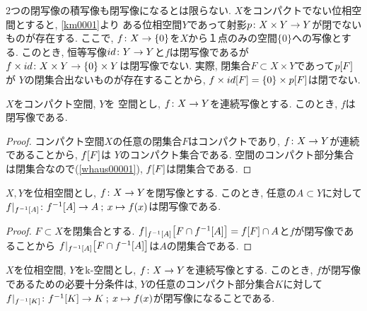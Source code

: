 \documentclass[uplatex, dvipdfmx, a4paper, 12pt, class=jsbook, crop=false]{standalone}
\begin{document}
\begin{example}
	2つの閉写像の積写像も閉写像になるとは限らない.
	$ X $をコンパクトでない位相空間とすると, \cref{km0001}より
	ある位相空間$ Y $であって射影$ p\colon X \times Y\to Y $が閉でないものが存在する.
	ここで, $ f\colon X\to\{0\} $を$ X $から１点のみの空間$ \{0\} $への写像とする.
	このとき, 恒等写像$ id\colon Y\to Y $と$ f $は閉写像であるが
	$ f \times id\colon X \times Y\to\{0\} \times Y $は閉写像でない.
	実際, 閉集合$ F \subset X \times Y $であって$ \mapset{p}{F} $が
	$ Y $の閉集合出ないものが存在することから,
	$ \mapset{f \times id}{F} = \{0\} \times \mapset{p}{F} $は閉でない.
\end{example}

\begin{proposition}
	$ X $をコンパクト空間, $ Y $を \Hausdorff 空間とし, $ f\colon X\to Y $を連続写像とする.
	このとき, $ f $は閉写像である.
\end{proposition}

\begin{proof}
	コンパクト空間$ X $の任意の閉集合$ F $はコンパクトであり,
	$ f\colon X\to Y $が連続であることから, $ \mapset{f}{F} $は
	$ Y $のコンパクト集合である.
	\Hausdorff 空間のコンパクト部分集合は閉集合なので(\cref{whaus00001}),
	$ \mapset{f}{F} $は閉集合である.
\end{proof}

\begin{proposition}
	\label{c00002}
	$ X, Y $を位相空間とし, $ f\colon X\to Y $を閉写像とする.
	このとき, 任意の$ A \subset Y $に対して
	$ \morphto{f|_{\mapinvset{f}{A}}}{\mapinvset{f}{A}}{A}{x}{f(x)} $は閉写像である.
\end{proposition}

\begin{proof}
	$ F \subset X $を閉集合とする.
	$ \mapset{f|_{\mapinvset{f}{A}}}{F \cap \mapinvset{f}{A}}
	= \mapset{f}{F} \cap A $と$ f $が閉写像であることから
	$ \mapset{f|_{\mapinvset{f}{A}}}{F \cap \mapinvset{f}{A}} $は$ A $の閉集合である.
\end{proof}

\begin{proposition}
	$ X $を位相空間, $ Y $をk-空間とし, $ f\colon X\to Y $を連続写像とする.
	このとき, $ f $が閉写像であるための必要十分条件は, $ Y $の任意のコンパクト部分集合$ K $に対して
	$ \morphto{f|_{\mapinvset{f}{K}}}{\mapinvset{f}{K}}{K}{x}{f(x)} $が閉写像になることである.
\end{proposition}
\end{document}
